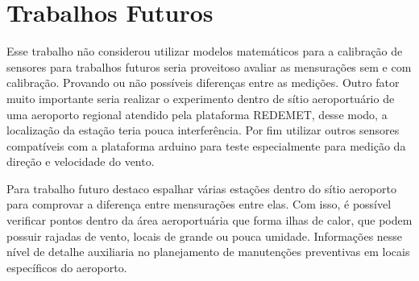 \section{Trabalhos Futuros}\label{trabalhosFuturos}

Esse trabalho não considerou utilizar modelos matemáticos para a calibração de sensores para trabalhos futuros seria proveitoso avaliar as mensurações sem e com calibração. Provando ou não possíveis diferenças entre as medições. Outro fator muito importante seria realizar o experimento dentro de sítio aeroportuário de uma aeroporto regional atendido pela plataforma REDEMET, desse modo, a localização da estação teria pouca interferência. Por fim utilizar outros sensores compatíveis com a plataforma arduino para teste especialmente para medição da direção e velocidade do vento.

Para trabalho futuro destaco espalhar várias estações dentro do sítio aeroporto para comprovar a diferença entre mensurações entre elas. Com isso, é possível verificar pontos dentro da área aeroportuária que forma ilhas de calor, que podem possuir rajadas de vento, locais de grande ou pouca umidade. Informações nesse nível de detalhe auxiliaria no planejamento de manutenções preventivas em locais específicos do aeroporto.


